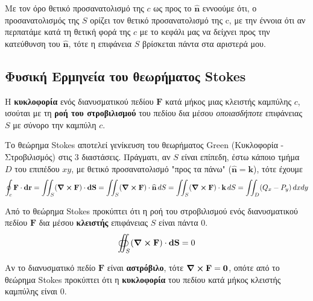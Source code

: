 \documentclass[a4paper,table]{report}
\begin{document}
\begin{rem}
  Με τον όρο θετικό προσανατολισμό της $c$ ως προς το $ \mathbf{\widehat{n}} $ εννοούμε ότι, 
  ο προσανατολισμός της $S$ ορίζει τον θετικό προσανατολισμό της c, με την έννοια ότι 
  αν περπατάμε κατά τη  θετική φορά της $c$ με το κεφάλι μας να δείχνει προς την 
  κατεύθυνση του $ \mathbf{\widehat{n}} $, τότε η επιφάνεια $S$ βρίσκεται πάντα στα αριστερά μου.
\end{rem}

\subsection*{Φυσική Ερμηνεία του θεωρήματος Stokes}

Η \textbf{κυκλοφορία} ενός διανυσματικού πεδίου $ \mathbf{F} $ κατά μήκος μιας κλειστής 
καμπύλης $c$, ισούται με τη \textbf{ροή του στροβιλισμού} του πεδίου δια μέσου
\textit{οποιασδήποτε} επιφάνειας $S$ με σύνορο την καμπύλη $c$. 

\begin{rems}
\item {}
  \begin{myitemize}
    \item Το θεώρημα Stokes αποτελεί γενίκευση του θεωρήματος Green (Κυκλοφορία -
      Στροβιλισμός) στις 3 διαστάσεις. 
      Πράγματι, αν $S$ είναι επίπεδη, έστω κάποιο τμήμα $D$ του επιπέδου $ xy $, 
      με θετικό προσανατολισμό "προς τα πάνω" ($ \mathbf{\widehat{n}}= \mathbf{k} $), 
      τότε έχουμε 
      \[
        \oint_{c} \mathbf{F}\cdot {\mathbf{dr}} = \iint_{S} (\curl\mathbf{F}) \cdot
        \mathbf{dS} = \iint_{S} (\curl\mathbf{F}) \cdot \mathbf{\widehat{n}} \,{dS} = 
        \iint_{S} (\curl \mathbf{F}) \cdot \mathbf{k} \,{dS} = 
        \iint_{D} (Q_{x}-P_{y}) \,{dx}{dy}
      \] 
    \item Από το θεώρημα Stokes προκύπτει ότι η ροή του στροβιλισμού ενός διανυσματικού
      πεδίου $ \mathbf{F} $ δια μέσου \textbf{κλειστής} επιφάνειας $S$ είναι πάντα 0.
      \[
        \oiint_{S} (\curl\mathbf{F}) \cdot {\mathbf{dS}} = 0 
      \]
    \item Αν το διανυσματικό πεδίο $ \mathbf{F} $ είναι \textbf{αστρόβιλο}, 
      τότε $ \curl \mathbf{F} = \mathbf{0} $, οπότε από το θεώρημα Stokes προκύπτει ότι 
      η \textbf{κυκλοφορία} του πεδίου κατά μήκος κλειστής καμπύλης είναι 0.
  \end{myitemize}
\end{rems}
\end{document}
